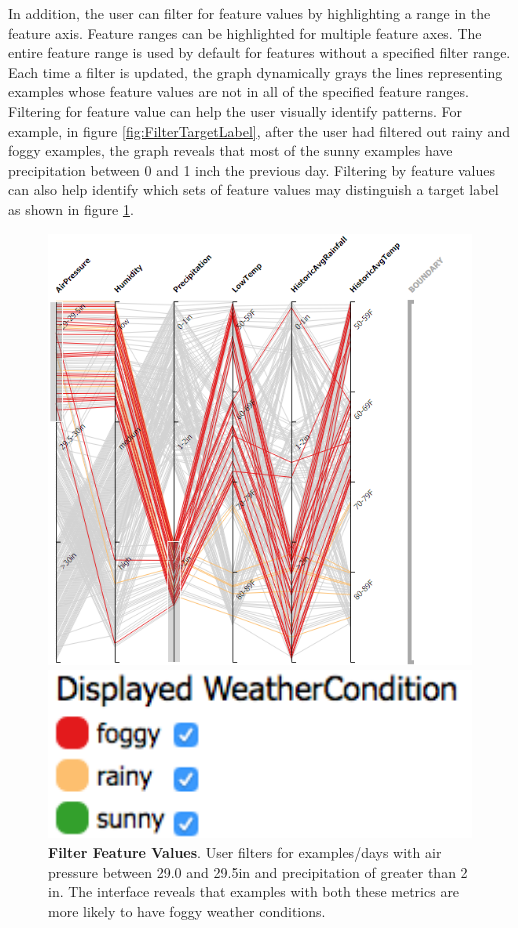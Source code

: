 In addition, the user can filter for feature values by highlighting a range in the feature axis. Feature ranges can be highlighted for multiple feature axes. The entire feature range is used by default for features without a specified filter range. Each time a filter is updated, the graph dynamically grays the lines representing examples whose feature values are not in all of the specified feature ranges. Filtering for feature value can help the user visually identify patterns. For example, in figure \ref{fig:FilterTargetLabel}, after the user had filtered out rainy and foggy examples, the graph reveals that most of the sunny examples have precipitation between 0 and 1 inch the previous day. Filtering by feature values can also help identify which sets of feature values may distinguish a target label as shown in figure \ref{fig:FilterValues}.

\begin{figure}[!htbp]
    \centering
    \begin{minipage}{0.7\textwidth}
        \centering
        \includegraphics[width=.85\textwidth]{FilterValues}
    \end{minipage}\hfill
    \begin{minipage}{0.3\textwidth}
        \centering
        \includegraphics[width=1\textwidth]{FilterValuesLegend}
    \end{minipage}
    \caption{\textbf{Filter Feature Values}. User filters for examples/days with air pressure between 29.0 and 29.5in and precipitation of greater than 2 in. The interface reveals that examples with both these metrics are more likely to have foggy weather conditions.}
    \label{fig:FilterValues}
\end{figure}

